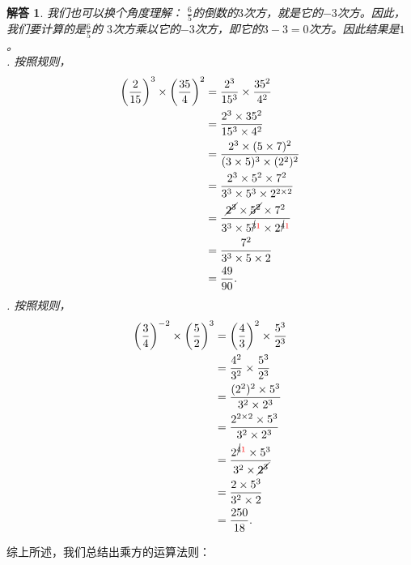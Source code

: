 \documentclass[12pt,UTF8]{ctexbook}
\newtheorem*{so}{解答}
\begin{document}
\begin{so}
    我们也可以换个角度理解：
    $\frac{6}{5}$的倒数的$3$次方，就是它的$-3$次方。因此，我们要计算的是$\frac{6}{5}$的
    $3$次方乘以它的$-3$次方，即它的$3-3=0$次方。因此结果是$1$。\\
    . 按照规则，
    \begin{align*}
        \left(\frac{2}{15}\right)^3\times \left(\frac{35}{4}\right)^2 &= \frac{2^3}{15^3}\times \frac{35^2}{4^2} \\
        &= \frac{2^3\times 35^2}{15^3\times 4^2} \\
        &= \frac{2^3\times (5\times 7)^2}{(3\times 5)^3\times (2^2)^2} \\
        &= \frac{2^3\times 5^2 \times 7^2}{3^3\times 5^{3} \times 2^{2\times 2}} \\
        &= \frac{\cancel{2^3}\times \cancel{5^2} \times 7^2}{3^3\times 5^{\cancel{3}{\color{red} 1}} \times 2^{\cancel{4}{\color{red} 1}}} \\
        &= \frac{7^2}{3^3\times 5 \times 2} \\
        &= \frac{49}{90}.
    \end{align*}
    . 按照规则，
    \begin{align*}
        \left(\frac{3}{4}\right)^{-2}\times \left(\frac{5}{2}\right)^3 &= \left(\frac{4}{3}\right)^2\times \frac{5^3}{2^3} \\
        &= \frac{4^2}{3^2} \times \frac{5^3}{2^3} \\
        &= \frac{(2^2)^2 \times 5^3}{3^2\times 2^3} \\
        &= \frac{2^{2\times 2} \times 5^3}{3^2 \times 2^3} \\
        &= \frac{2^{\cancel{4}{\color{red} 1}} \times 5^3}{3^2 \times \cancel{2^3}} \\
        &= \frac{2 \times 5^3}{3^2\times 2} \\
        &= \frac{250}{18}.
    \end{align*}
\end{so}

综上所述，我们总结出乘方的运算法则：
\begin{center}
\end{center}
\end{document}
